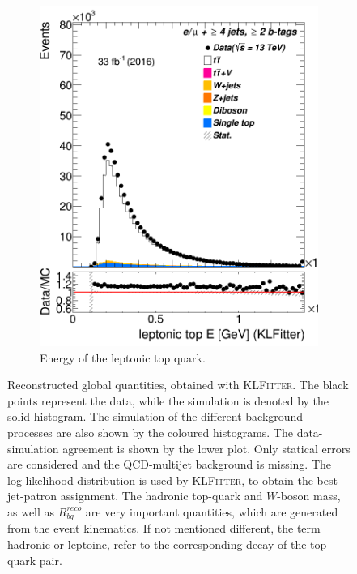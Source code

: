 \begin{figure}
\begin{subfigure}{0.25\textwidth}
	\includegraphics[width=\linewidth]{ControlPlots_emujets_2016_4incl_2incl/klf_topLEP_E_emujets_2016.png}
	\caption{Energy of the leptonic top quark.} \label{fig:K11}
\end{subfigure}

\caption{Reconstructed global quantities, obtained with \textsc{KLFitter}. The black points represent the data, while the simulation is denoted by the solid histogram. The simulation of the different background processes are also shown by the coloured histograms. The data-simulation agreement is shown by the lower plot. Only statical errors are considered and the QCD-multijet background  is missing. The log-likelihood distribution is used by \textsc{KLFitter}, to obtain the best jet-patron assignment. The hadronic top-quark and  $W$-boson mass, as well as $R_{bq}^{reco}$ are very important quantities, which are generated from the event kinematics. If not mentioned different, the term hadronic or leptoinc, refer to the corresponding decay of the top-quark pair.}\label{klf100}
\end{figure}	



